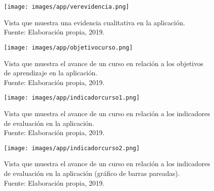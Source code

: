 \begin{figure}[H]
	\centering
	\captionsetup{justification=centering}
	\texttt{[image: images/app/verevidencia.png]}
	\caption[Vista que muestra una evidencia cualitativa en la aplicación.]{{Vista que muestra una evidencia cualitativa en la aplicación.\\Fuente: Elaboración propia, 2019.}}
\end{figure}

\begin{figure}[H]
	\centering
	\captionsetup{justification=centering}
	\texttt{[image: images/app/objetivocurso.png]}
	\caption[Vista que muestra el avance de un curso en relación a los objetivos de aprendizaje en la aplicación.]{{Vista que muestra el avance de un curso en relación a los objetivos de aprendizaje en la aplicación.\\Fuente: Elaboración propia, 2019.}}
\end{figure}

\begin{figure}[H]
	\centering
	\captionsetup{justification=centering}
	\texttt{[image: images/app/indicadorcurso1.png]}
	\caption[Vista que muestra el avance de un curso en relación a los indicadores de evaluación en la aplicación.]{{Vista que muestra el avance de un curso en relación a los indicadores de evaluación en la aplicación.\\Fuente: Elaboración propia, 2019.}}
\end{figure}
\begin{figure}[H]
	\centering
	\captionsetup{justification=centering}
	\texttt{[image: images/app/indicadorcurso2.png]}
	\caption[Vista que muestra el avance de un curso en relación a los indicadores de evaluación en la aplicación (gráfico de barras pareadas).]{{Vista que muestra el avance de un curso en relación a los indicadores de evaluación en la aplicación (gráfico de barras pareadas).\\Fuente: Elaboración propia, 2019.}}
\end{figure}